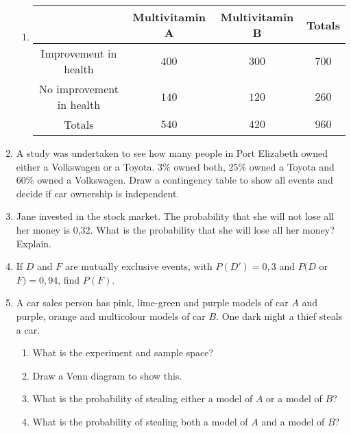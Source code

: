 \begin{enumerate}
\begin{enumerate}
	\item \begin{center}
\begin{tabular}{|c|c|c|c|}
\hline
                         & Multivitamin A & Multivitamin B & Totals \\
\hline
Improvement in health    & $400$            & $300$            & $700$    \\
No improvement in health & $140 $           &$ 120 $           & $260 $   \\
\hline
Totals                   & $540 $           & $420$            & $960$    \\
\hline
\end{tabular}

\end{center}
	\end{enumerate}
\item A study was undertaken to see how many people in Port Elizabeth owned either a Volkswagen or a Toyota. $3\%$ owned both, $25\%$ owned a Toyota and $60\%$ owned a Volkswagen. Draw a contingency table to show all events and decide if car ownership is independent.
\item Jane invested in the stock market. The probability that she will not lose all her money is 0,32. What is the probability that she will lose all her money? Explain.
\item If $D$ and $ F$ are mutually exclusive events, with $P(D')=0,3$ and $P(D$ or $F)=0,94$, find $P(F)$.
\item A car sales person has pink, lime-green and purple models of car $A$ and purple, orange and multicolour models of car $B$. One dark night a thief steals a car. 
	\begin{enumerate}
	\item What is the experiment and sample space? 
	\item Draw a Venn diagram to show this.
	\item What is the probability of stealing either a model of $A$ or a model of $B$?
	\item What is the probability of stealing both a model of $A$ and a model of $B$?
	\end{enumerate}

\end{enumerate}
